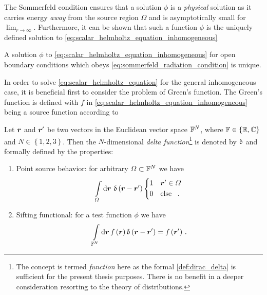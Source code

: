 The Sommerfeld condition ensures that a solution $\phi$ is a \emph{physical}
solution as it carries energy \emph{away} from the source region $\Omega$ and is
asymptotically small for $\lim_{r \to \infty}$.
Furthermore, it can be shown \cite[pp.~190]{Sommerfeld1964} that such a function
$\phi$ is the uniquely defined solution to
\eqref{eq:scalar_helmholtz_equation_inhomogeneous}
\begin{theorem}[Uniqueness]
	A solution $\phi$ to \eqref{eq:scalar_helmholtz_equation_inhomogeneous}
	for open boundary conditions which obeys
	\eqref{eq:sommerfeld_radiation_condition} is unique.
\end{theorem}

In order to solve \eqref{eq:scalar_helmholtz_equation} for the general
inhomogeneous case, it is beneficial first to consider the problem of Green's
function.
The Green's function is defined with $f$ in
\eqref{eq:scalar_helmholtz_equation_inhomogeneous} being a source function
according to
\begin{definition}\label{def:dirac_delta}
	Let $\robs$ and $\rsrc$ be two vectors in the Euclidean vector space
	$\mathbb{F}^N$, where $\mathbb{F} \in \left\{\mathbb{R}, \mathbb{C}\right\}$ and
	$N \in \left\{1, 2, 3\right\}$.
	Then the $N$-dimensional \emph{delta function}\footnote{The concept is
	termed \emph{function} here as the formal \cref{def:dirac_delta} is
	sufficient for the present thesis purposes.
	There is no benefit in a deeper consideration resorting to the theory of
	distributions\cite{Strichartz2003}.} is denoted by
	$\operatorname{\updelta}$ and formally defined by the properties:
	\begin{enumerate}[label=(\alph*)]
		\item Point source behavior: for arbitrary $\Omega \subset \mathbb{F}^N$ we
		have
		\begin{equation}
			\int\limits_{\Omega} \dd \pvec{r} \,
			\diracDelta \left( \robs - \rsrc \right)
			\begin{cases*}
				1 & $\rsrc \in \Omega$ \\
				0 & \text{else} \, .
			\end{cases*} 
		\end{equation}
		\item Sifting functional: for a test function $\phi$ 
		\cite{Strichartz2003}\cite[p.~35]{Olver2010} we have
		\begin{equation}\label{eq:delta_filter_property}
			\int\limits_{\F^N} \dd \pvec{r} \,
			f \left( \robs \right)
			\diracDelta \left(\robs-\rsrc\right) =
			f \left( \rsrc \right)
			\, .
		\end{equation}
	\end{enumerate}
\end{definition}

